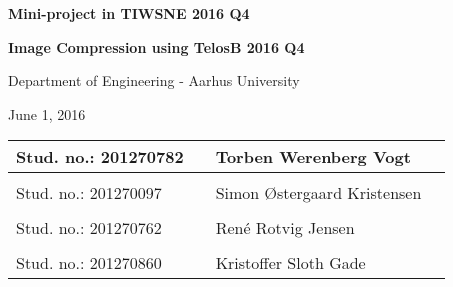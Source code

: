 
\centerline{\Huge\bfseries\color{ThemeColor} Mini-project in TIWSNE 2016 Q4}


\vspace{1em}
\centerline{\Large\bfseries\color{BlackColor} Image Compression using TelosB 2016 Q4}


\vspace{5em}
\centerline{\large\bfseries\color{BlackColor}}
\centerline{\large\color{BlackColor}Department of Engineering - Aarhus University}

\vspace{0.5em}
\centerline{\large\color{BlackColor} June 1, 2016}

\vspace{25em}

\begin{center}
   \begin{tabular}{ l p{3cm} l l }
   Stud. no.: 201270782 && Torben Werenberg Vogt & \\\hline
   & & \\
   Stud. no.: 201270097 && Simon Østergaard Kristensen & \\\hline
   & & \\
   Stud. no.: 201270762 && René Rotvig Jensen & \\\hline
   & & \\
   Stud. no.: 201270860 && Kristoffer Sloth Gade & \\\hline
   \end{tabular}
\end{center}
\thispagestyle{empty} %
\restoregeometry

